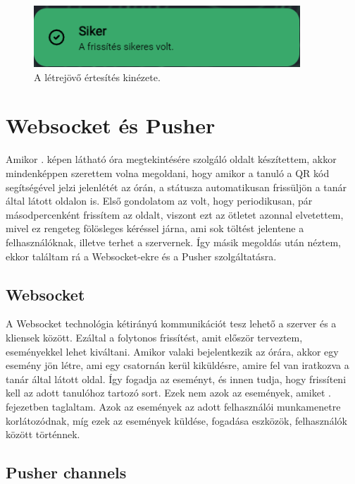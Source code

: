 \documentclass[
]{thesis-ekf}
\theoremstyle{definition}
\theoremstyle{remark}
\begin{document}
\begin{figure}[ht!]
	\centering
	\includegraphics[width=10cm]{../pictures/screenshots/notif.png}
	\caption{A létrejövő értesítés kinézete.}
	\label{toastUI}
\end{figure}

\section{Websocket és Pusher}

Amikor . képen látható óra megtekintésére szolgáló oldalt készítettem, akkor mindenképpen szerettem volna megoldani, hogy amikor a tanuló a QR kód segítségével jelzi jelenlétét az órán, a státusza automatikusan frissüljön a tanár által látott oldalon is. Első gondolatom az volt, hogy periodikusan, pár másodpercenként frissítem az oldalt, viszont ezt az ötletet azonnal elvetettem, mivel ez rengeteg fölösleges kéréssel járna, ami sok töltést jelentene a felhasználóknak, illetve terhet a szervernek. Így másik megoldás után néztem, ekkor találtam rá a Websocket-ekre és a Pusher szolgáltatásra.

\subsection{Websocket}

A Websocket technológia kétirányú kommunikációt tesz lehető a szerver és a kliensek között. Ezáltal a folytonos frissítést, amit először terveztem, eseményekkel lehet kiváltani.\cite{websocket} Amikor valaki bejelentkezik az órára, akkor egy esemény jön létre, ami egy csatornán kerül kiküldésre, amire fel van iratkozva a tanár által látott oldal. Így fogadja az eseményt, és innen tudja, hogy frissíteni kell az adott tanulóhoz tartozó sort. Ezek nem azok az események, amiket . fejezetben taglaltam. Azok az események az adott felhasználói munkamenetre korlátozódnak, míg ezek az események küldése, fogadása eszközök, felhasználók között történnek.

\subsection{Pusher channels}
\end{document}
